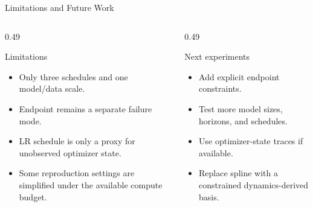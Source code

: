 \documentclass[fontset=fandol,aspectratio=169,10pt]{ctexbeamer}
\begin{document}
\begin{frame}{Limitations and Future Work}
  \begin{columns}[T,onlytextwidth]
    \begin{column}{0.49\textwidth}
      \begin{block}{Limitations}
        \begin{itemize}
          \item Only three schedules and one model/data scale.
          \item Endpoint remains a separate failure mode.
          \item LR schedule is only a proxy for unobserved optimizer state.
          \item Some reproduction settings are simplified under the available compute budget.
        \end{itemize}
      \end{block}
    \end{column}
    \begin{column}{0.49\textwidth}
      \begin{block}{Next experiments}
        \begin{itemize}
          \item Add explicit endpoint constraints.
          \item Test more model sizes, horizons, and schedules.
          \item Use optimizer-state traces if available.
          \item Replace spline with a constrained dynamics-derived basis.
        \end{itemize}
      \end{block}
    \end{column}
  \end{columns}
\end{frame}
\end{document}
